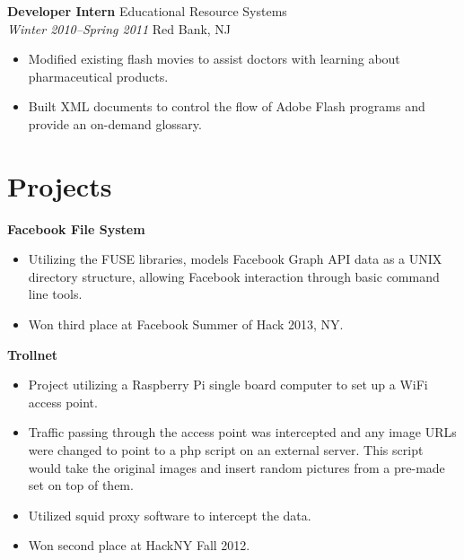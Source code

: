 \documentclass[centered,overlapped]{res}
\begin{document}
\begin{resume}
{\bf Developer Intern} \hfill Educational Resource Systems\\
\textit{Winter 2010--Spring 2011} \hfill  Red Bank, NJ
\begin{itemize} \itemsep -2pt %
	\item Modified existing flash movies to assist doctors with learning about pharmaceutical products.
	\item Built XML documents to control the flow of Adobe Flash programs and provide an on-demand glossary.
\end{itemize}


\section{Projects}

	{\bf Facebook File System}
	\begin{itemize} \itemsep -2pt
		\item Utilizing the FUSE libraries, models Facebook Graph API data as a
            UNIX directory structure, allowing Facebook interaction through
            basic command line tools.
        \item Won third place at Facebook Summer of Hack 2013, NY.
	\end{itemize}

	{\bf Trollnet}
	\begin{itemize} \itemsep -2pt
		\item Project utilizing a Raspberry Pi single board computer to set up a WiFi access point.
		\item Traffic passing through the access point was intercepted and any image URLs were changed to point to a php script on an external server. This script would take the original images and insert random pictures from a pre-made set on top of them.
		\item Utilized squid proxy software to intercept the data.
		\item Won second place at HackNY Fall 2012.
	\end{itemize}


\end{resume}
\end{document}
